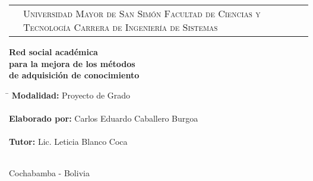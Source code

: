 \newcommand{\umsslogo}{
\adjustbox{valign=t}{}
}
\newcommand{\fcytlogo}{
\adjustbox{valign=t}{}
}

\begin{titlepage}

\begin{tabular}[t]{c p{8.6cm} c}
\umsslogo &
\vfill
\large{\textsc{Universidad Mayor de San Simón}} \newline
\large{\textsc{Facultad de Ciencias y Tecnología}} \newline
\large{\textsc{Carrera de Ingeniería de Sistemas}} &
\fcytlogo \\
\end{tabular}
\vfill
\begin{center}
\huge{\bf{Red social académica\\
para la mejora de los métodos\\
de adquisición de conocimiento}}
\end{center}
\vfill
\begin{tabbing}
\hspace{4cm}\=\+
\textbf{Modalidad:} Proyecto de Grado\\
\\
\textbf{Elaborado por:} Carlos Eduardo Caballero Burgoa\\
\\
\textbf{Tutor:} Lic. Leticia Blanco Coca\\
\\
\end{tabbing}
\begin{center}
Cochabamba - Bolivia
\end{center}
\end{titlepage}

